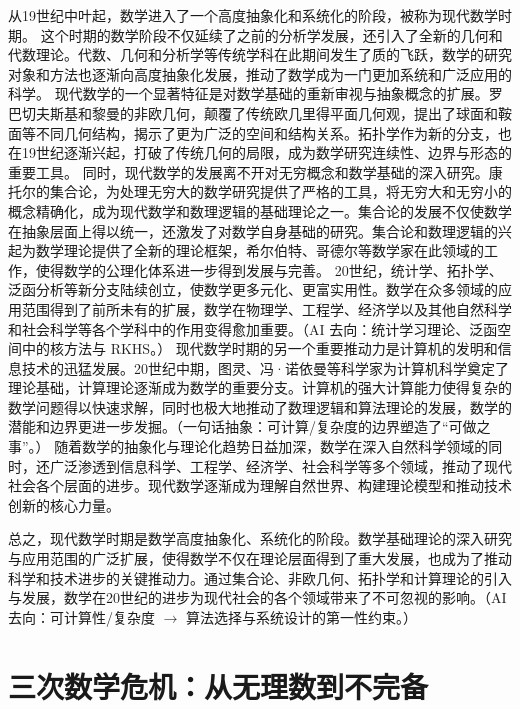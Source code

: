 从19世纪中叶起，数学进入了一个高度抽象化和系统化的阶段，被称为现代数学时期。
这个时期的数学阶段不仅延续了之前的分析学发展，还引入了全新的几何和代数理论。代数、几何和分析学等传统学科在此期间发生了质的飞跃，数学的研究对象和方法也逐渐向高度抽象化发展，推动了数学成为一门更加系统和广泛应用的科学。
现代数学的一个显著特征是对数学基础的重新审视与抽象概念的扩展。罗巴切夫斯基和黎曼的非欧几何，颠覆了传统欧几里得平面几何观，提出了球面和鞍面等不同几何结构，揭示了更为广泛的空间和结构关系。拓扑学作为新的分支，也在19世纪逐渐兴起，打破了传统几何的局限，成为数学研究连续性、边界与形态的重要工具。
同时，现代数学的发展离不开对无穷概念和数学基础的深入研究。康托尔的集合论，为处理无穷大的数学研究提供了严格的工具，将无穷大和无穷小的概念精确化，成为现代数学和数理逻辑的基础理论之一。集合论的发展不仅使数学在抽象层面上得以统一，还激发了对数学自身基础的研究。集合论和数理逻辑的兴起为数学理论提供了全新的理论框架，希尔伯特、哥德尔等数学家在此领域的工作，使得数学的公理化体系进一步得到发展与完善。
20世纪，统计学、拓扑学、泛函分析等新分支陆续创立，使数学更多元化、更富实用性。数学在众多领域的应用范围得到了前所未有的扩展，数学在物理学、工程学、经济学以及其他自然科学和社会科学等各个学科中的作用变得愈加重要。{（AI 去向：统计学习理论、泛函空间中的核方法与 RKHS。）}
现代数学时期的另一个重要推动力是计算机的发明和信息技术的迅猛发展。20世纪中期，图灵、冯·诺依曼等科学家为计算机科学奠定了理论基础，计算理论逐渐成为数学的重要分支。计算机的强大计算能力使得复杂的数学问题得以快速求解，同时也极大地推动了数理逻辑和算法理论的发展，数学的潜能和边界更进一步发掘。{（一句话抽象：可计算/复杂度的边界塑造了“可做之事”。）}
随着数学的抽象化与理论化趋势日益加深，数学在深入自然科学领域的同时，还广泛渗透到信息科学、工程学、经济学、社会科学等多个领域，推动了现代社会各个层面的进步。现代数学逐渐成为理解自然世界、构建理论模型和推动技术创新的核心力量。


总之，现代数学时期是数学高度抽象化、系统化的阶段。数学基础理论的深入研究与应用范围的广泛扩展，使得数学不仅在理论层面得到了重大发展，也成为了推动科学和技术进步的关键推动力。通过集合论、非欧几何、拓扑学和计算理论的引入与发展，数学在20世纪的进步为现代社会的各个领域带来了不可忽视的影响。{（AI 去向：可计算性/复杂度 $\rightarrow$ 算法选择与系统设计的第一性约束。）}
\section{ 三次数学危机：从无理数到不完备}

